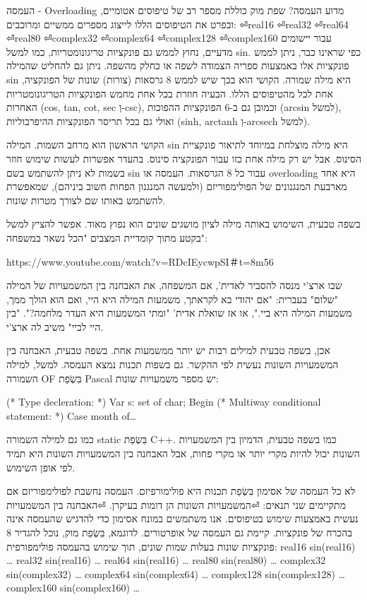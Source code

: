 \begin{טבלא}[!htbp]
      העמסה - Overloading
      מדוע העמסה?
      שפת מוק כוללת מספר רב של טיפוסים אטומיים, ובפרט את הטיפוסים הללו לייצוג מספרים ממשיים ומרוכבים:
⏎real16
⏎real32
⏎real64
⏎real80
⏎complex32
⏎complex64
⏎complex128
⏎complex160
      עבור יישומים מדעיים, נחוץ לממש גם פונקציות טריגונומטריות, כמו למשל sin. כפי שראינו כבר, ניתן לממש פונקציות אלו באמצעות ספריה הצמודה לשפה או כחלק מהשפה. ניתן גם להחליט שהמילה sin היא מילה שמורה. הקושי הוא בכך שיש לממש 8 גרסאות (צורות) שונות של הפונקציה, אחת לכל מהטיפוסים הללו. הבעיה חוזרת בכל אחת מחמש הפונקציות הטריגונומטריות האחרות (cos, tan, cot, sec וְ-csc), וכמובן גם ב-6 הפונקציות ההפוכות (arcsin למשל), ואולי גם בכל תריסר הפונקציות ההיפרבוליות (sinh, arctanh וְ-arcsech למשל).

      הקושי הראשון הוא מרחב השמות. המילה sin היא מילה מוצלחת במיוחד לתיאור פונקציית הסינוס. אבל יש רק מילה אחת כזו עבור הפונקציה סינוס. בהעדר אפשרות לעשות שימוש חוזר בשמות לא ניתן להשתמש בשם sin עבור כל 8 הגרסאות. העמסה או overloading היא אחד מארבעת המנגנונים של הפולימפוריזם (ולמעשה המנגנון הפחות חשוב ביניהם), שמאפשרת להשתמש באותו שם לצורך מטרות שונות.

      בשפה טבעית, השימוש באותה מילה לציון מושגים שונים הוא נפוץ מאוד. אפשר להציץ למשל בקטע מתוך קומדיית המצבים "הכל נשאר במשפחה":

      https://www.youtube.com/watch?v=RDcIEycwpSI＃t=8m56

      שבו ארצ'י מנסה להסביר לאדית', אם המשפחה, את האבחנה בין המשמעויות של המילה "שלום" בעברית: "אם יהודי בא לקראתך, משמעות המילה היא היי, ואם הוא הולך ממך, משמעות המילה היא ביי.", או אז שואלת אדית' "ומתי המשמעות היא העדר מלחמה?". "בין היי לביי" משיב לה ארצ'י.

      אכן, בשפה טבעית למילים רבות יש יותר ממשמעות אחת. בשפה טבעית, האבחנה בין המשמעויות השונות נעשית לפי ההקשר. גם בשפות תכנות נמצא העמסה. למשל, למילה השמורה OF בִּשְׂפַת Pascal יש מספר משמעויות שונות:

      (* Type decleration: *)
      Var s: set of char;
      Begin
      (* Multiway conditional statement: *)
      Case month of…

      כמו גם למילה השמורה static בִּשְׂפַת C++. כמו בשפה טבעית, הדמיון בין המשמעויות השונות יכול להיות מקרי יותר או מקרי פחות, אבל האבחנה בין המשמעויות השונות היא תמיד לפי אופן השימוש.

      לא כל העמסה של אסימון בִּשְׂפַת תכנות היא פולימורפיזם. העמסה נחשבת לפולימפוריזם אם מתקיימים שני תנאים:
⏎המשמעויות השונות הן דומות בעיקרן.
⏎האבחנה בין המשמעויות נעשית באמצעות שימוש בטיפוסים.
      אנו משתמשים במונח אסימון כדי להדגיש שהעמסה אינה בהכרח של פונקציות. קיימת גם העמסה של אופרטורים.
      לדוגמא, בִּשְׂפַת מוק, נוכל להגדיר 8 פונקציות שונות בעלות שמות שונים, תוך שימוש בהעמסה פולימפורפית:
      real16 sin(real16) {…}
      real32 sin(real16) {…}
      real64 sin(real16) {…}
      real80 sin(real80) {…}
      complex32 sin(complex32) {…}
      complex64 sin(complex64) {…}
      complex128 sin(complex128) {…}
      complex160 sin(complex160) {…}


\end{טבלא}
